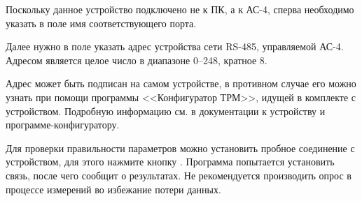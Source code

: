 Поскольку данное устройство подключено не к ПК, а к АС-4, сперва необходимо указать в поле  имя соответствующего порта.

Далее нужно в поле  указать адрес устройства сети RS-485, управляемой АС-4. Адресом является целое число в диапазоне 0--248, кратное 8.

Адрес может быть подписан на самом устройстве, в противном случае его можно узнать при помощи программы <<Конфигуратор ТРМ>>, идущей в комплекте с устройством. Подробную информацию см. в документации к устройству и программе-конфигуратору.

\bigskip

Для проверки правильности параметров можно установить пробное соединение с устройством, для этого нажмите кнопку . Программа попытается установить связь, после чего сообщит о результатах. Не рекомендуется производить опрос в процессе измерений во избежание потери данных.